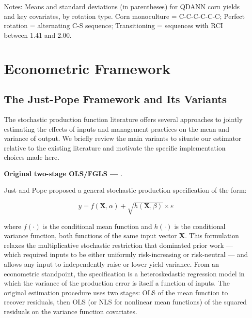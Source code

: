 \documentclass[12pt,letterpaper]{article}
\theoremstyle{remark}
\theoremstyle{plain}
\theoremstyle{definition}
\begin{document}
\begin{table}[H]
  \centering
  \caption{Summary statistics by rotation type}
  \label{tab:summary}
  \begin{threeparttable}
    
    \begin{tablenotes}
      \small
      \item Notes: Means and standard deviations (in parentheses) for QDANN corn yields and key covariates, by rotation type. Corn monoculture = C-C-C-C-C-C; Perfect rotation = alternating C-S sequence; Transitioning = sequences with RCI between 1.41 and 2.00.
    \end{tablenotes}
  \end{threeparttable}
\end{table}
	
\section{Econometric Framework\label{sec:econ_framework}}
\subsection{\label{subsec:just_pope}The Just-Pope Framework and Its Variants}
The stochastic production function literature offers several approaches to jointly estimating the effects of inputs and management practices on the mean and variance of output. We briefly review the main variants to situate our estimator relative to the existing literature and motivate the specific implementation choices made here.

\textbf{Original two-stage OLS/FGLS — \cite{Just1978, Just1979}}. 

Just and Pope proposed a general stochastic production specification of the form:

\begin{equation}
    y = f(\mathbf{X},\alpha)+\sqrt{h(\mathbf{X},\beta)}\times \varepsilon
\end{equation}

where $f(\cdot)$ is the conditional mean function and $h(\cdot)$ is the conditional variance function, both functions of the same input vector $\mathbf{X}$. This formulation relaxes the multiplicative stochastic restriction that dominated prior work — which
required inputs to be either uniformly risk-increasing or risk-neutral — and allows any input to independently raise or lower yield variance. From an econometric standpoint, the specification is a heteroskedastic regression model in which the variance of the production error is itself a function of inputs. The original estimation procedure uses two stages: OLS of the mean function to recover residuals, then OLS (or NLS for nonlinear mean functions) of the squared residuals on the variance function covariates.
\end{document}
